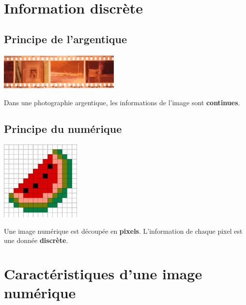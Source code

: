 \documentclass[a4paper,11pt]{article}
\begin{document}
\begin{center}
\end{center}
\section{Information discrète}
\subsection{Principe de l'argentique}
\begin{center}
    \centering
    \includegraphics[width=6cm]{ressources/pellicule.jpg}
    \label{IMG}
\end{center}
\begin{aretenir}[]
    Dans une photographie argentique, les informations de l'image sont \textbf{continues}.
\end{aretenir}
\subsection{Principe du numérique}
\begin{center}
    \centering
    \includegraphics[width=4cm]{ressources/pasteque.jpg}
    \label{IMG}
\end{center}
\begin{aretenir}[]
    Une image numérique est découpée en \textbf{pixels}. L'information de chaque pixel est une donnée \textbf{discrète}.
\end{aretenir}
\section{Caractéristiques d'une image numérique}
\end{document}
